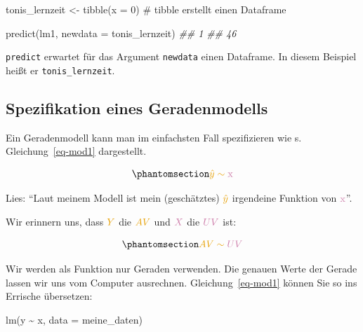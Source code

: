 \documentclass[
  letterpaper,
  oneside,
  open=any]{scrbook}
\newenvironment{Shaded}{\begin{snugshade}}{\end{snugshade}}
\newcommand{\AttributeTok}[1]{\textcolor[rgb]{0.40,0.45,0.13}{#1}}
\newcommand{\CommentTok}[1]{\textcolor[rgb]{0.37,0.37,0.37}{#1}}
\newcommand{\DecValTok}[1]{\textcolor[rgb]{0.68,0.00,0.00}{#1}}
\newcommand{\DocumentationTok}[1]{\textcolor[rgb]{0.37,0.37,0.37}{\textit{#1}}}
\newcommand{\FunctionTok}[1]{\textcolor[rgb]{0.28,0.35,0.67}{#1}}
\newcommand{\NormalTok}[1]{\textcolor[rgb]{0.00,0.23,0.31}{#1}}
\newcommand{\OtherTok}[1]{\textcolor[rgb]{0.00,0.23,0.31}{#1}}
\newcommand{\SpecialCharTok}[1]{\textcolor[rgb]{0.37,0.37,0.37}{#1}}
\theoremstyle{definition}
\theoremstyle{definition}
\theoremstyle{definition}
\theoremstyle{remark}
\begin{document}
\begin{Shaded}
\begin{Highlighting}[]
\NormalTok{tonis\_lernzeit }\OtherTok{\textless{}{-}} \FunctionTok{tibble}\NormalTok{(}\AttributeTok{x =} \DecValTok{0}\NormalTok{)  }\CommentTok{\# \textasciigrave{}tibble\textasciigrave{} erstellt einen Dataframe}
\end{Highlighting}
\end{Shaded}

\begin{Shaded}
\begin{Highlighting}[]
\FunctionTok{predict}\NormalTok{(lm1, }\AttributeTok{newdata =}\NormalTok{ tonis\_lernzeit)}
\DocumentationTok{\#\#  1 }
\DocumentationTok{\#\# 46}
\end{Highlighting}
\end{Shaded}

\texttt{predict} erwartet für das Argument \texttt{newdata} einen
Dataframe. In diesem Beispiel heißt er \texttt{tonis\_lernzeit}.

\subsection{Spezifikation eines
Geradenmodells}\label{spezifikation-eines-geradenmodells}

Ein Geradenmodell kann man im einfachsten Fall spezifizieren wie s.
Gleichung~\ref{eq-mod1} dargestellt.

\begin{equation}\phantomsection\label{eq-mod1}{\color{ycol}{\hat{y}} \sim \color{xcol}{\text{x}}}\end{equation}

Lies: \enquote{Laut meinem Modell ist mein (geschätztes)
\(\color{ycol}{\hat{y}}\) irgendeine Funktion von
\(\color{xcol}{\text{x}}\)}.

Wir erinnern uns, dass \(\color{ycol}{Y}\) die \(\color{ycol}{AV}\) und
\(\color{xcol}{X}\) die \(\color{xcol}{UV}\) ist:

\begin{equation}\phantomsection\label{eq-mod1}{\color{ycol}{AV} \sim \color{xcol}{UV}}\end{equation}

Wir werden als Funktion nur Geraden verwenden. Die genauen Werte der
Gerade lassen wir uns vom Computer ausrechnen. Gleichung~\ref{eq-mod1}
können Sie so ins Errische übersetzen:

\begin{Shaded}
\begin{Highlighting}[]
\FunctionTok{lm}\NormalTok{(y }\SpecialCharTok{\textasciitilde{}}\NormalTok{ x, }\AttributeTok{data =}\NormalTok{ meine\_daten)}
\end{Highlighting}
\end{Shaded}
\end{document}
